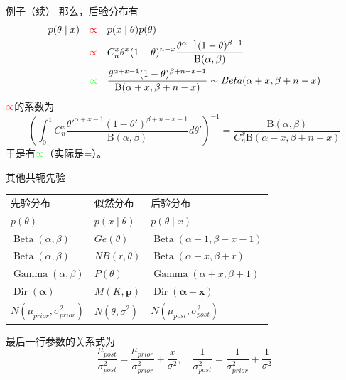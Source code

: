 \documentclass[10pt]{beamer}
\begin{document}
\begin{frame}

\begin{block}{例子（续）}
那么，后验分布有
\begin{align*}
p(\theta \mid x) \quad & {\color{red}\propto} \quad p(x \mid \theta) p(\theta) \\
& {\color{red}\propto} \quad C_n^x \theta^x (1-\theta)^{n-x} \dfrac{\theta^{\alpha-1} (1-\theta)^{\beta-1}}{\mathrm{B}(\alpha,\beta)} \\
& {\color{green}\propto} \quad \dfrac{\theta^{\alpha+x-1} (1-\theta)^{\beta+n-x-1}}{\mathrm{B}(\alpha+x,\beta+n-x)} \sim Beta(\alpha+x,\beta+n-x)
\end{align*}
${\color{red}\propto}$的系数为
$$\left( \int_0^1 C_n^x \dfrac{\theta'^{\alpha+x-1} (1-\theta')^{\beta+n-x-1}}{\mathrm{B}(\alpha,\beta)} d\theta' \right)^{-1} = \dfrac{\mathrm{B}(\alpha,\beta)}{C_n^x \mathrm{B}(\alpha+x,\beta+n-x)}$$
于是有${\color{green}\propto}$（实际是=）。
\end{block}

\end{frame}


\begin{frame}

\begin{block}{其他共轭先验}
\begin{center}
\renewcommand{\arraystretch}{1.3}
\begin{tabu} to 1\textwidth { | X[1.2,c] | X[0.8,c] | X[2,c] | }
\hline
先验分布 & 似然分布 & 后验分布 \\
$p(\theta)$ & $p(x \mid \theta)$ & $p(\theta \mid x)$ \\
\hline
$\operatorname{Beta}(\alpha,\beta)$ & $Ge(\theta)$ & $\operatorname{Beta}(\alpha+1,\beta+x-1)$ \\
\hline
$\operatorname{Beta}(\alpha,\beta)$ & $NB(r,\theta)$ & $\operatorname{Beta}(\alpha+x,\beta+r)$ \\
\hline
$\operatorname{Gamma}(\alpha,\beta)$ & $P(\theta)$ & $\operatorname{Gamma}(\alpha+x,\beta+1)$ \\
\hline
$\operatorname{Dir}(\boldsymbol\alpha)$ & $M(K,\mathbf{p})$ & $\operatorname{Dir}(\boldsymbol\alpha + \mathbf{x})$ \\
\hline
$N(\mu_{prior},\sigma^2_{prior})$ & $N(\theta,\sigma^2)$ & $N(\mu_{post},\sigma^2_{post})$ \\
\hline
\end{tabu}
\renewcommand{\arraystretch}{1}
\end{center}
最后一行参数的关系式为
$$\dfrac{\mu_{post}}{\sigma^2_{post}} = \dfrac{\mu_{prior}}{\sigma^2_{prior}} + \dfrac{x}{\sigma^2}, \quad \dfrac{1}{\sigma^2_{post}} = \dfrac{1}{\sigma^2_{prior}} + \dfrac{1}{\sigma^2}$$
\end{block}

\end{frame}
\end{document}
